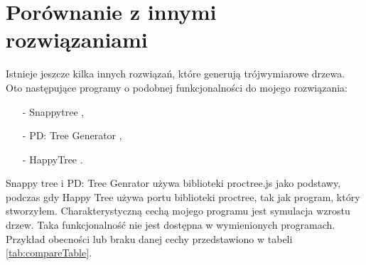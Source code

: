 \documentclass[a4paper,twoside,12pt]{report}
\begin{document}
\section{Porównanie z innymi rozwiązaniami}

Istnieje jeszcze kilka innych rozwiązań, które generują 
trójwymiarowe drzewa. Oto następujące programy o podobnej 
funkcjonalności do mojego rozwiązania:
\begin{itemize}
	\item[-] Snappytree \cite{snappyTree},
	\item[-] PD: Tree Generator \cite{PDTree},
	\item[-] HappyTree \cite{proctree}. 
\end{itemize}
Snappy tree i PD: Tree Genrator używa biblioteki proctree.js 
jako podstawy, podczas gdy Happy Tree używa portu biblioteki proctree, 
tak jak program, który stworzyłem.
Charakterystyczną cechą mojego programu jest symulacja wzrostu drzew. 
Taka funkcjonalność nie jest dostępna w wymienionych programach.
Przykład obecności lub braku danej cechy przedstawiono w tabeli \ref{tab:compareTable}.
\end{document}
